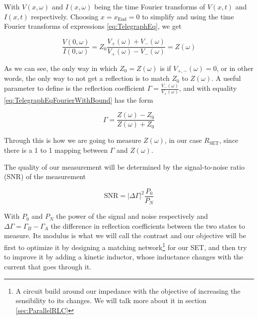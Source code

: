 \documentclass[../main.tex]{subfiles}
\begin{document}
With \(V(x,\omega)\) and \(I(x,\omega)\) being the time Fourier transforms of
\(V(x,t)\) and \(I(x,t)\) respectively. Choosing \(x=x_{\text{End}}=0\) to
simplify and using the time Fourier transforms of expressions
\ref{eq:TelegraphEq}, we get

\begin{equation}
\label{eq:TelegraphEqFourierWithBound}
    \frac{V(0,\omega)}{I(0,\omega)} =
    Z_{0}\frac{V_{+}(\omega) + V_{-}(\omega)}
    {V_{+}(\omega) - V_{-}(\omega)} = Z(\omega)
\end{equation}

As we can see, the only way in which \(Z_{0} = Z(\omega)\) is if
\(V_{+,-}(\omega)=0\), or in other words, the only way to not get a reflection
is to match \(Z_{0}\) to \(Z(\omega)\). A useful parameter to define is the
reflection coefficient \(\Gamma = \frac{V_{-}(\omega)}{V_{+}(\omega)}\), and
with equality \ref{eq:TelegraphEqFourierWithBound} has the form

\begin{equation}
\label{eq:ReflecCoeff}
    \Gamma = \frac{Z(\omega) - Z_{0}}{Z(\omega) + Z_{0}}
\end{equation}

Through this is how we are going to measure \(Z(\omega)\), in our case
\(R_{\text{SET}}\), since there is a 1 to 1 mapping between \(\Gamma\) and
\(Z(\omega)\).

The quality of our measurement will be determined by the signal-to-noise ratio
(SNR) of the measurement

\begin{equation}
\label{eq:SNR}
\text{SNR} = |\Delta\Gamma|^2\frac{P_{0}}{P_{N}}
\end{equation}

With \(P_{0}\) and \(P_{N}\) the power of the signal and noise respectively and
\(\Delta\Gamma = \Gamma_{B} - \Gamma_{A}\) the difference in reflection
coefficients between the two states to measure. Its modulus is what we will
call the contrast and our objective will be first to optimize it by designing
a matching network\footnote{A circuit build around our impedance with the
objective of increasing the sensibility to its changes. We will talk more
about it in section \ref{sec:ParallelRLC}} for our SET, and then try to improve
it by adding a kinetic inductor, whose inductance changes with the current that
goes through it.

\end{document}
